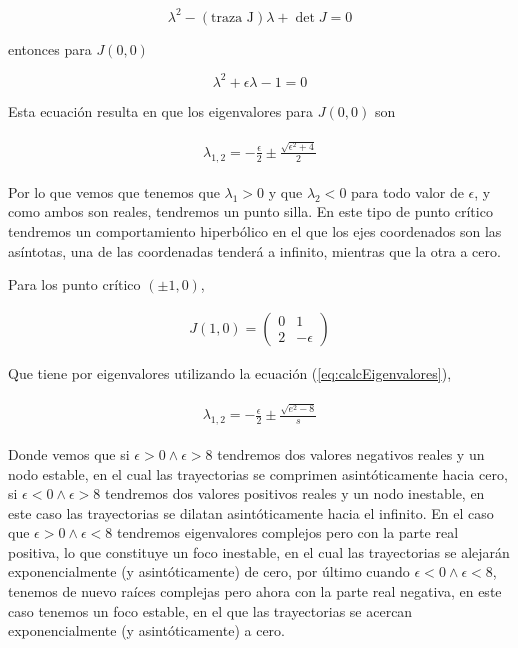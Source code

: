 \documentclass[a4paper,10pt]{article}
\numberwithin{equation}{section}
\begin{document}
\begin{equation}
 \lambda^2 - (\text{traza J}) \lambda + \det{J} = 0
 \label{eq:calcEigenvalores}
\end{equation}

entonces para $J(0,0)$

\begin{equation}
 \lambda^2 + \epsilon \lambda - 1 = 0
\end{equation}

Esta ecuación resulta en que los eigenvalores para $J(0,0)$ son

\begin{align}
 \begin{split}
  \lambda_{1,2} = - \frac{\epsilon}{2} \pm \frac{\sqrt{\epsilon^2 + 4}}{2}
 \end{split}
\end{align}

Por lo que vemos que tenemos que $\lambda_1 > 0$ y que $\lambda_2 < 0$ para todo valor
de $\epsilon$, y como ambos son reales, tendremos un punto silla. En este tipo de punto
crítico tendremos un comportamiento hiperbólico en el que los ejes coordenados son 
las asíntotas, una de las coordenadas tenderá a infinito, mientras que la otra a cero.

Para los punto crítico $(\pm 1,0)$,

\begin{align}
J(1,0) = \begin{pmatrix}
     0 & 1 \\
     2 & -\epsilon
\end{pmatrix}
\label{eq:jacobiana3s}
\end{align}

Que tiene por eigenvalores utilizando la ecuación (\ref{eq:calcEigenvalores}),

\begin{align}
 \begin{split}
  \lambda_{1,2} = - \frac{\epsilon}{2} \pm \frac{\sqrt{e^2-8}}{s}
 \end{split}
\end{align}

Donde vemos que si $\epsilon > 0 \wedge \epsilon > 8$ tendremos dos valores negativos
reales y un nodo estable, en el cual las trayectorias se comprimen asintóticamente hacia
cero, si $\epsilon < 0 \wedge \epsilon > 8$ tendremos dos valores positivos reales y un
nodo inestable, en este caso las trayectorias se dilatan asintóticamente hacia el infinito.
En el caso que $\epsilon > 0 \wedge \epsilon < 8$ tendremos eigenvalores complejos
pero con la parte real positiva, lo que constituye un foco inestable, en el cual las trayectorias
se alejarán exponencialmente (y asintóticamente) de cero, por último cuando $\epsilon < 0 \wedge \epsilon < 8$, tenemos
de nuevo raíces complejas pero ahora con la parte real negativa, en este caso tenemos un
foco estable, en el que las trayectorias se acercan exponencialmente (y asintóticamente) a cero.
\end{document}
